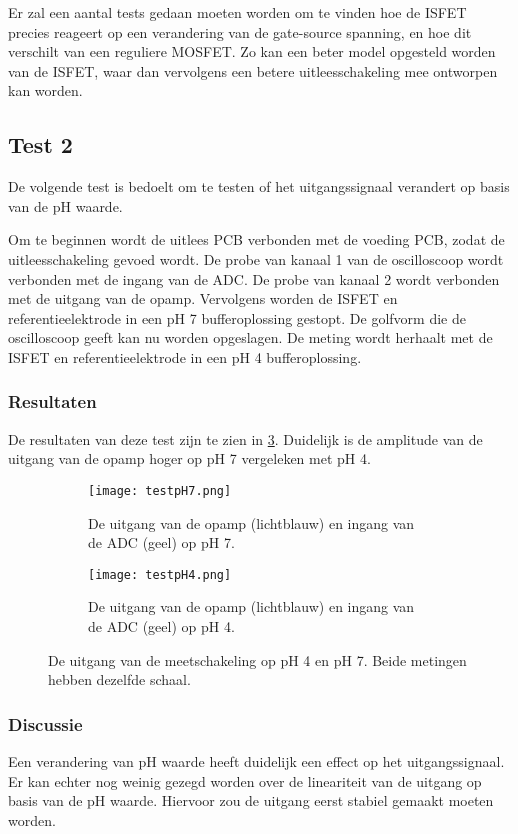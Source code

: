 Er zal een aantal tests gedaan moeten worden om te vinden hoe de ISFET precies reageert op een verandering van de gate-source spanning, en hoe dit verschilt van een reguliere MOSFET. Zo kan een beter model opgesteld worden van de ISFET, waar dan vervolgens een betere uitleesschakeling mee ontworpen kan worden.


\subsection{Test 2} 
De volgende test is bedoelt om te testen of het uitgangssignaal verandert op basis van de pH waarde. 

Om te beginnen wordt de uitlees PCB verbonden met de voeding PCB, zodat de uitleesschakeling gevoed wordt. De probe van kanaal 1 van de oscilloscoop wordt verbonden met de ingang van de ADC. De probe van kanaal 2 wordt verbonden met de uitgang van de opamp. Vervolgens worden de ISFET en referentieelektrode in een pH 7 bufferoplossing gestopt. De golfvorm die de oscilloscoop geeft kan nu worden opgeslagen. De meting wordt herhaalt met de ISFET en referentieelektrode in een pH 4 bufferoplossing.

\subsubsection{Resultaten}
De resultaten van deze test zijn te zien in \cref{fig:resultspHMeasure}. Duidelijk is de amplitude van de uitgang van de opamp hoger op pH 7 vergeleken met pH 4.

\begin{figure}[ht]
    \centering
    \begin{subfigure}[b]{0.475\textwidth}
        \centering
        \def\svgwidth{\textwidth}
        \texttt{[image: testpH7.png]}
        \caption{De uitgang van de opamp (lichtblauw) en ingang van de ADC (geel) op pH 7.}
        \label{fig:resultpH7}
    \end{subfigure}
    \hfill
    \begin{subfigure}[b]{0.475\textwidth}
        \centering
        \def\svgwidth{\textwidth}
        \texttt{[image: testpH4.png]}
        \caption{De uitgang van de opamp (lichtblauw) en ingang van de ADC (geel) op pH 4.}
        \label{fig:resultpH4}
    \end{subfigure}
    \caption{De uitgang van de meetschakeling op pH 4 en pH 7. Beide metingen hebben dezelfde schaal.}
    \label{fig:resultspHMeasure}
\end{figure}

\subsubsection{Discussie}
Een verandering van pH waarde heeft duidelijk een effect op het uitgangssignaal. Er kan echter nog weinig gezegd worden over de lineariteit van de uitgang op basis van de pH waarde. Hiervoor zou de uitgang eerst stabiel gemaakt moeten worden.
